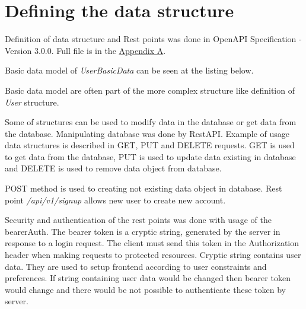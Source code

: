 \section{Defining the data structure}
Definition of data structure and Rest points was done in 
OpenAPI Specification - Version 3.0.0. Full file is in the \hyperref[sec:appendix_a]{Appendix A}.

Basic data model of \textit{UserBasicData} can be seen at the listing below.



Basic data model are often part of the more complex structure like definition of \textit{User} structure.


Some of structures can be used to modify data in the database or get data from the database. Manipulating database was done by RestAPI. Example of usage data structures is described in GET, PUT and DELETE requests. GET is used to get data from the database, PUT is used to update data existing in database and DELETE is used to remove data object from database.


POST method is used to creating not existing data object in database. Rest point \textit{/api/v1/signup} allows new user to create new account. 


Security and authentication of the rest points was done with usage of the bearerAuth. The bearer token is a cryptic string, generated by the server in response to a login request. The client must send this token in the Authorization header when making requests to protected resources. Cryptic string contains user data. They are used to setup frontend according to user constraints and preferences. If string containing user data would be changed then bearer token would change and there would be not possible to authenticate these token by server.







